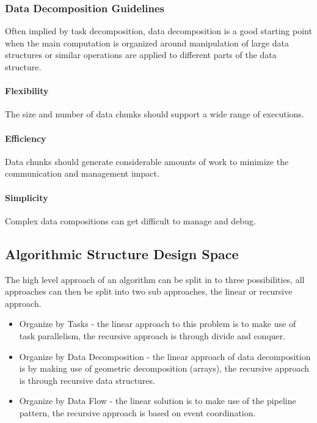 \subsubsection{Data Decomposition Guidelines}

Often implied by task decomposition,
data decomposition is a good starting point when the main computation is organized around manipulation of large data structures
or similar operations are applied to different parts of the data structure.

\paragraph{Flexibility}
The size and number of data chunks should support a wide range of executions.

\paragraph{Efficiency}
Data chunks should generate considerable amounts of work to minimize the communication and management impact.

\paragraph{Simplicity}
Complex data compositions can get difficult to manage and debug.

\subsection{Algorithmic Structure Design Space}

The high level approach of an algorithm can be split in to three possibilities, all approaches can then be split into two sub approaches,
the linear or recursive approach.

\begin{itemize}
    \item Organize by Tasks - the linear approach to this problem is to make use of task parallelism, the recursive approach is through divide and conquer.
    \item Organize by Data Decomposition - the linear approach of data decomposition is by making use of geometric decomposition (arrays), the recursive approach is through recursive data structures.
    \item Organize by Data Flow - the linear solution is to make use of the pipeline pattern, the recursive approach is based on event coordination.
\end{itemize}

